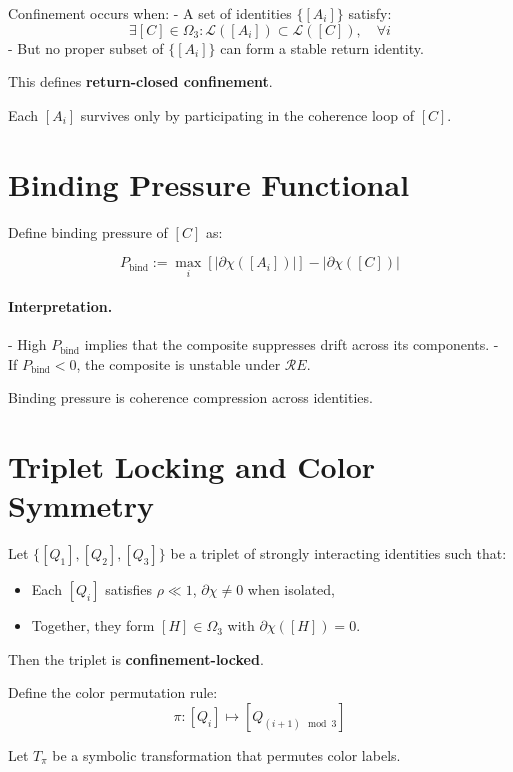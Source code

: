 Confinement occurs when:
- A set of identities $\{[A_i]\}$ satisfy:
  \[
  \exists [C] \in \Omega_3: \mathcal{L}([A_i]) \subset \mathcal{L}([C]),\quad \forall i
  \]
- But no proper subset of $\{[A_i]\}$ can form a stable return identity.

This defines \textbf{return-closed confinement}.

Each $[A_i]$ survives only by participating in the coherence loop of $[C]$.

\section{Binding Pressure Functional} \label{sec:binding-pressure}

Define binding pressure of $[C]$ as:

\[
P_{\text{bind}} := \max_i \left[ \left| \partial\chi([A_i]) \right| \right] - \left| \partial\chi([C]) \right|
\]

\paragraph{Interpretation.}
- High $P_{\text{bind}}$ implies that the composite suppresses drift across its components.
- If $P_{\text{bind}} < 0$, the composite is unstable under $\mathcal{R}E$.

Binding pressure is coherence compression across identities.

\section{Triplet Locking and Color Symmetry} \label{sec:triplet-locking}

Let $\{[Q_1],[Q_2],[Q_3]\}$ be a triplet of strongly interacting identities such that:

\begin{itemize}
  \item Each $[Q_i]$ satisfies $\rho \ll 1$, $\partial\chi \ne 0$ when isolated,
  \item Together, they form $[H] \in \Omega_3$ with $\partial\chi([H]) = 0$.
\end{itemize}

Then the triplet is \textbf{confinement-locked}.

Define the color permutation rule:
\[
\pi: [Q_i] \mapsto [Q_{(i+1) \mod 3}]
\]

Let $T_\pi$ be a symbolic transformation that permutes color labels.

